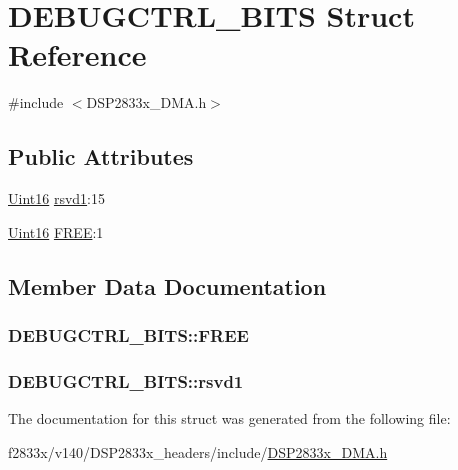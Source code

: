 \hypertarget{struct_d_e_b_u_g_c_t_r_l___b_i_t_s}{}\section{D\+E\+B\+U\+G\+C\+T\+R\+L\+\_\+\+B\+I\+T\+S Struct Reference}
\label{struct_d_e_b_u_g_c_t_r_l___b_i_t_s}


{\ttfamily \#include $<$D\+S\+P2833x\+\_\+\+D\+M\+A.\+h$>$}

\subsection*{Public Attributes}
\begin{DoxyCompactItemize}
\item 
\hyperlink{_d_s_p2833x___device_8h_a59a9f6be4562c327cbfb4f7e8e18f08b}{Uint16} \hyperlink{struct_d_e_b_u_g_c_t_r_l___b_i_t_s_af0b9a66536ae7001b42675c9a46de259}{rsvd1}\+:15
\item 
\hyperlink{_d_s_p2833x___device_8h_a59a9f6be4562c327cbfb4f7e8e18f08b}{Uint16} \hyperlink{struct_d_e_b_u_g_c_t_r_l___b_i_t_s_a161e78dce5191b26d23b974c6a09c3c5}{F\+R\+E\+E}\+:1
\end{DoxyCompactItemize}


\subsection{Member Data Documentation}
\hypertarget{struct_d_e_b_u_g_c_t_r_l___b_i_t_s_a161e78dce5191b26d23b974c6a09c3c5}{}
\subsubsection[{F\+R\+E\+E}]{ D\+E\+B\+U\+G\+C\+T\+R\+L\+\_\+\+B\+I\+T\+S\+::\+F\+R\+E\+E}\label{struct_d_e_b_u_g_c_t_r_l___b_i_t_s_a161e78dce5191b26d23b974c6a09c3c5}
\hypertarget{struct_d_e_b_u_g_c_t_r_l___b_i_t_s_af0b9a66536ae7001b42675c9a46de259}{}
\subsubsection[{rsvd1}]{ D\+E\+B\+U\+G\+C\+T\+R\+L\+\_\+\+B\+I\+T\+S\+::rsvd1}\label{struct_d_e_b_u_g_c_t_r_l___b_i_t_s_af0b9a66536ae7001b42675c9a46de259}


The documentation for this struct was generated from the following file\+:\begin{DoxyCompactItemize}
\item 
f2833x/v140/\+D\+S\+P2833x\+\_\+headers/include/\hyperlink{_d_s_p2833x___d_m_a_8h}{D\+S\+P2833x\+\_\+\+D\+M\+A.\+h}\end{DoxyCompactItemize}
